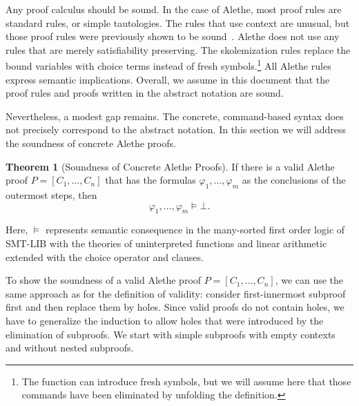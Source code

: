 \documentclass{scrartcl}
\newcommand\smtlib{SMT-LIB}
\newcommand{\ruleTypeImpl}[1]{%
  \microtypesetup{tracking=false}\textsf{#1}\microtypesetup{tracking=true}%
}
\def\proofRule#1{\hyperref[rule:\detokenize{#1}]{\ruleTypeImpl{\detokenize{#1}}}} %
\theoremstyle{definition}
\newtheorem{theorem}{Theorem}[example]
\begin{document}
Any proof calculus should be sound.  In the case of Alethe, most proof
rules are
standard rules, or simple tautologies.  The rules that use context
are unusual, but those proof rules were previously shown to be
sound~\cite{barbosa-2019}.
Alethe does not use any rules that are merely satisfiability preserving.
The skolemization rules replace the bound variables with choice terms
instead of fresh symbols.\footnote{The  function
can introduce fresh symbols, but we will assume here that those
commands have been eliminated by unfolding the definition.}
All Alethe rules express semantic implications.
Overall, we assume in this document that the proof rules and proofs
written in the abstract notation are sound.

Nevertheless, a modest gap remains.  The concrete, command-based
syntax does not precisely correspond to the abstract notation.
In this section we will address the soundness of concrete Alethe
proofs.

\begin{theorem}[Soundness of Concrete Alethe Proofs]
  \label{thm:sound}
  If there is a valid Alethe proof $P = [C_1, \dots, C_n]$ that has the formulas
  $\varphi_1, \dots, \varphi_m$ as the conclusions of the outermost \proofRule{assume}
  steps, then
  \[
  \varphi_1, \dots, \varphi_m \vDash \bot.
  \]
\end{theorem}

Here, $\vDash$ represents
semantic consequence in the many-sorted first order logic of {\smtlib}
with the theories of uninterpreted functions and linear arithmetic extended
with the choice operator and  clauses.

To show the soundness of a valid Alethe proof $P = [C_1, \dots, C_n]$,
we can use the same approach as for the definition of validity: consider
first-innermost subproof first and then replace them by holes.
%
Since valid proofs do not contain holes, we have to generalize the induction
to allow holes that were introduced by the elimination of subproofs.
%
We start with simple subproofs with empty contexts and without
nested subproofs.
\end{document}
